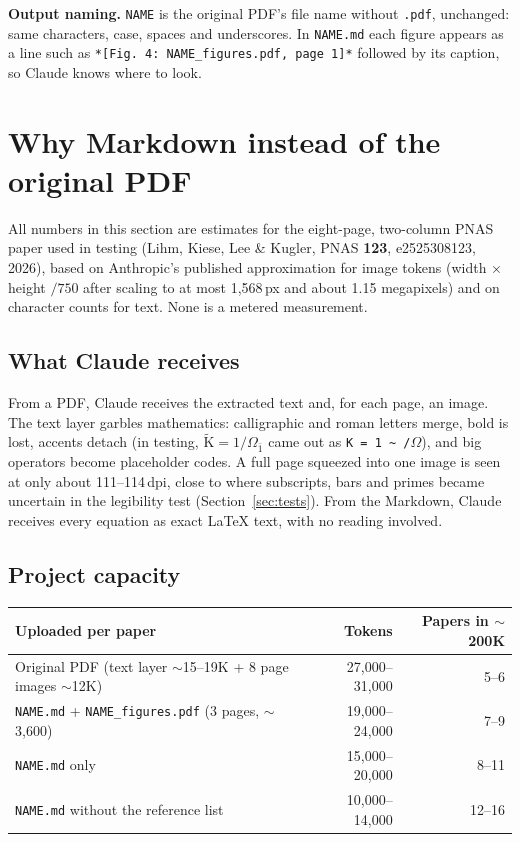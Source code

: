 \documentclass[11pt]{article}
\newcommand{\file}[1]{\texttt{#1}}
\begin{document}
\textbf{Output naming.} \texttt{NAME} is the original PDF's file name without
\texttt{.pdf}, unchanged: same characters, case, spaces and underscores. In
\file{NAME.md} each figure appears as a line such as
\texttt{*[Fig.\ 4: NAME\_figures.pdf, page 1]*} followed by its caption, so
Claude knows where to look.

\section{Why Markdown instead of the original PDF}
\label{sec:why}

All numbers in this section are estimates for the eight-page, two-column PNAS
paper used in testing (Lihm, Kiese, Lee \& Kugler, PNAS \textbf{123},
e2525308123, 2026), based on Anthropic's published approximation for image
tokens (width $\times$ height $/750$ after scaling to at most 1{,}568\,px and
about 1.15 megapixels) and on character counts for text. None is a metered
measurement.

\subsection{What Claude receives}

From a PDF, Claude receives the extracted text and, for each page, an image.
The text layer garbles mathematics: calligraphic and roman letters merge, bold
is lost, accents detach (in testing, $\tilde{\mathrm K}=1/\Omega_{\bar 1}$ came
out as \texttt{K = 1 \~{} /}$\Omega$\texttt{}), and big operators
become placeholder codes. A full page squeezed into one image is seen at only
about 111--114\,dpi, close to where subscripts, bars and primes became uncertain
in the legibility test (Section~\ref{sec:tests}). From the Markdown, Claude
receives every equation as exact LaTeX text, with no reading involved.

\subsection{Project capacity}

\begin{tabularx}{\linewidth}{@{}Lrr@{}}
\toprule
Uploaded per paper & Tokens & Papers in $\sim$200K \\
\midrule
Original PDF (text layer $\sim$15--19K + 8 page images $\sim$12K) & 27{,}000--31{,}000 & 5--6 \\
\file{NAME.md} + \file{NAME\_figures.pdf} (3 pages, $\sim$3{,}600) & 19{,}000--24{,}000 & 7--9 \\
\file{NAME.md} only & 15{,}000--20{,}000 & 8--11 \\
\file{NAME.md} without the reference list & 10{,}000--14{,}000 & 12--16 \\
\bottomrule
\end{tabularx}
\end{document}
